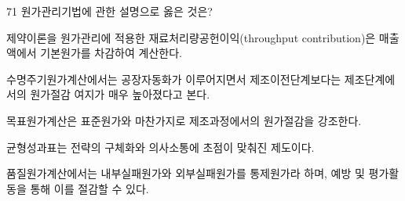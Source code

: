 \begin{question}{71}
원가관리기법에 관한 설명으로 옳은 것은?
\begin{choices}
  \item 제약이론을 원가관리에 적용한 재료처리량공헌이익(throughput contribution)은 매출액에서 기본원가를 차감하여 계산한다.
  \item 수명주기원가계산에서는 공장자동화가 이루어지면서 제조이전단계보다는 제조단계에서의 원가절감 여지가 매우 높아졌다고 본다.
  \item 목표원가계산은 표준원가와 마찬가지로 제조과정에서의 원가절감을 강조한다.
  \item 균형성과표는 전략의 구체화와 의사소통에 초점이 맞춰진 제도이다.
  \item 품질원가계산에서는 내부실패원가와 외부실패원가를 통제원가라 하며, 예방 및 평가활동을 통해 이를 절감할 수 있다.
\end{choices}
\end{question}
